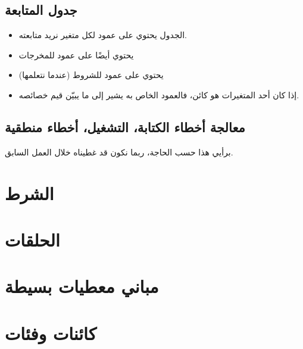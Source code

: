\documentclass[12pt]{article}
\begin{document}
\subsection{جدول المتابعة}

\begin{itemize}
    \item الجدول يحتوي على عمود لكل متغير نريد متابعته.
    \item يحتوي أيضًا على عمود للمخرجات
    \item يحتوي على عمود للشروط (عندما نتعلمها)
    \item إذا كان أحد المتغيرات هو كائن، فالعمود الخاص به يشير إلى ما يبيّن قيم خصائصه.
\end{itemize}

\subsection{معالجة أخطاء الكتابة، التشغيل، أخطاء منطقية}

برأيي هذا حسب الحاجة، ربما نكون قد غطيناه خلال العمل السابق.

\section{الشرط}

\section{الحلقات}

\section{مباني معطيات بسيطة}

\section{كائنات وفئات}
\end{document}
